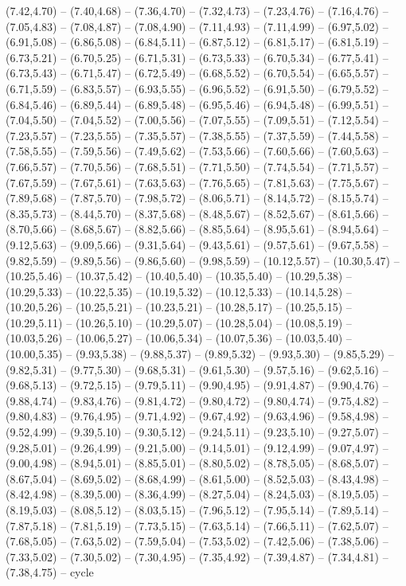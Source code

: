 \expandafter\def\csname geo:gebiet:RUS\endcsname{
  (7.42,4.70) -- (7.40,4.68) -- (7.36,4.70) -- (7.32,4.73) -- (7.23,4.76) -- (7.16,4.76) -- (7.05,4.83) -- (7.08,4.87) -- (7.08,4.90) -- (7.11,4.93) -- (7.11,4.99) -- (6.97,5.02) -- (6.91,5.08) -- (6.86,5.08) -- (6.84,5.11) -- (6.87,5.12) -- (6.81,5.17) -- (6.81,5.19) -- (6.73,5.21) -- (6.70,5.25) -- (6.71,5.31) -- (6.73,5.33) -- (6.70,5.34) -- (6.77,5.41) -- (6.73,5.43) -- (6.71,5.47) -- (6.72,5.49) -- (6.68,5.52) -- (6.70,5.54) -- (6.65,5.57) -- (6.71,5.59) -- (6.83,5.57) -- (6.93,5.55) -- (6.96,5.52) -- (6.91,5.50) -- (6.79,5.52) -- (6.84,5.46) -- (6.89,5.44) -- (6.89,5.48) -- (6.95,5.46) -- (6.94,5.48) -- (6.99,5.51) -- (7.04,5.50) -- (7.04,5.52) -- (7.00,5.56) -- (7.07,5.55) -- (7.09,5.51) -- (7.12,5.54) -- (7.23,5.57) -- (7.23,5.55) -- (7.35,5.57) -- (7.38,5.55) -- (7.37,5.59) -- (7.44,5.58) -- (7.58,5.55) -- (7.59,5.56) -- (7.49,5.62) -- (7.53,5.66) -- (7.60,5.66) -- (7.60,5.63) -- (7.66,5.57) -- (7.70,5.56) -- (7.68,5.51) -- (7.71,5.50) -- (7.74,5.54) -- (7.71,5.57) -- (7.67,5.59) -- (7.67,5.61) -- (7.63,5.63) -- (7.76,5.65) -- (7.81,5.63) -- (7.75,5.67) -- (7.89,5.68) -- (7.87,5.70) -- (7.98,5.72) -- (8.06,5.71) -- (8.14,5.72) -- (8.15,5.74) -- (8.35,5.73) -- (8.44,5.70) -- (8.37,5.68) -- (8.48,5.67) -- (8.52,5.67) -- (8.61,5.66) -- (8.70,5.66) -- (8.68,5.67) -- (8.82,5.66) -- (8.85,5.64) -- (8.95,5.61) -- (8.94,5.64) -- (9.12,5.63) -- (9.09,5.66) -- (9.31,5.64) -- (9.43,5.61) -- (9.57,5.61) -- (9.67,5.58) -- (9.82,5.59) -- (9.89,5.56) -- (9.86,5.60) -- (9.98,5.59) -- (10.12,5.57) -- (10.30,5.47) -- (10.25,5.46) -- (10.37,5.42) -- (10.40,5.40) -- (10.35,5.40) -- (10.29,5.38) -- (10.29,5.33) -- (10.22,5.35) -- (10.19,5.32) -- (10.12,5.33) -- (10.14,5.28) -- (10.20,5.26) -- (10.25,5.21) -- (10.23,5.21) -- (10.28,5.17) -- (10.25,5.15) -- (10.29,5.11) -- (10.26,5.10) -- (10.29,5.07) -- (10.28,5.04) -- (10.08,5.19) -- (10.03,5.26) -- (10.06,5.27) -- (10.06,5.34) -- (10.07,5.36) -- (10.03,5.40) -- (10.00,5.35) -- (9.93,5.38) -- (9.88,5.37) -- (9.89,5.32) -- (9.93,5.30) -- (9.85,5.29) -- (9.82,5.31) -- (9.77,5.30) -- (9.68,5.31) -- (9.61,5.30) -- (9.57,5.16) -- (9.62,5.16) -- (9.68,5.13) -- (9.72,5.15) -- (9.79,5.11) -- (9.90,4.95) -- (9.91,4.87) -- (9.90,4.76) -- (9.88,4.74) -- (9.83,4.76) -- (9.81,4.72) -- (9.80,4.72) -- (9.80,4.74) -- (9.75,4.82) -- (9.80,4.83) -- (9.76,4.95) -- (9.71,4.92) -- (9.67,4.92) -- (9.63,4.96) -- (9.58,4.98) -- (9.52,4.99) -- (9.39,5.10) -- (9.30,5.12) -- (9.24,5.11) -- (9.23,5.10) -- (9.27,5.07) -- (9.28,5.01) -- (9.26,4.99) -- (9.21,5.00) -- (9.14,5.01) -- (9.12,4.99) -- (9.07,4.97) -- (9.00,4.98) -- (8.94,5.01) -- (8.85,5.01) -- (8.80,5.02) -- (8.78,5.05) -- (8.68,5.07) -- (8.67,5.04) -- (8.69,5.02) -- (8.68,4.99) -- (8.61,5.00) -- (8.52,5.03) -- (8.43,4.98) -- (8.42,4.98) -- (8.39,5.00) -- (8.36,4.99) -- (8.27,5.04) -- (8.24,5.03) -- (8.19,5.05) -- (8.19,5.03) -- (8.08,5.12) -- (8.03,5.15) -- (7.96,5.12) -- (7.95,5.14) -- (7.89,5.14) -- (7.87,5.18) -- (7.81,5.19) -- (7.73,5.15) -- (7.63,5.14) -- (7.66,5.11) -- (7.62,5.07) -- (7.68,5.05) -- (7.63,5.02) -- (7.59,5.04) -- (7.53,5.02) -- (7.42,5.06) -- (7.38,5.06) -- (7.33,5.02) -- (7.30,5.02) -- (7.30,4.95) -- (7.35,4.92) -- (7.39,4.87) -- (7.34,4.81) -- (7.38,4.75) -- cycle
}
